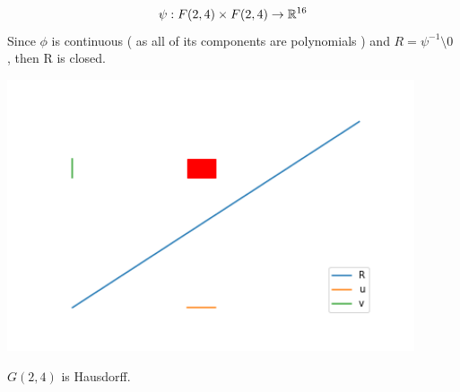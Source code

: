 \documentclass[11pt,a4paper]{report}
\begin{document}
$$ \psi:  F(2,4) \times F(2,4) \to \mathbb{R}^{16} $$
Since $\phi$ is continuous ( as all of its components are polynomials )  and $R = \psi^{-1} \setminus 0 $ , then R is closed.
\newline
\begin{center}
      \centering
      \includegraphics[width=0.90\textwidth]{graph_int.png}
\end{center}

\begin{Prop}
$G(2,4)$ is Hausdorff.
\end{Prop}
\end{document}
